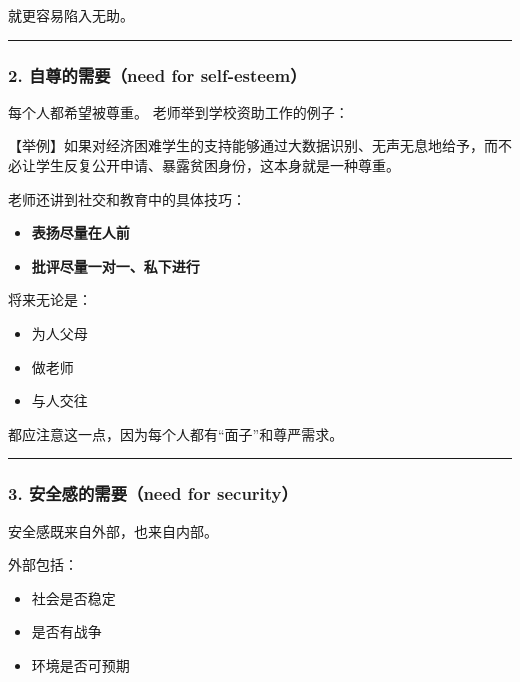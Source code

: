 \documentclass[
  chinese,
  9pt,
  a4paper,
]{ctexart}
\providecommand{\tightlist}{%
  \setlength{\itemsep}{0pt}\setlength{\parskip}{0pt}}
\begin{document}
就更容易陷入无助。

\begin{center}\rule{0.5\linewidth}{0.5pt}\end{center}

\subsubsection{2. 自尊的需要（need for
self-esteem）}\label{ux81eaux5c0aux7684ux9700ux8981need-for-self-esteem}

每个人都希望被尊重。 老师举到学校资助工作的例子：

【举例】如果对经济困难学生的支持能够通过大数据识别、无声无息地给予，而不必让学生反复公开申请、暴露贫困身份，这本身就是一种尊重。

老师还讲到社交和教育中的具体技巧：

\begin{itemize}
\tightlist
\item
  \textbf{表扬尽量在人前}
\item
  \textbf{批评尽量一对一、私下进行}
\end{itemize}

将来无论是：

\begin{itemize}
\tightlist
\item
  为人父母
\item
  做老师
\item
  与人交往
\end{itemize}

都应注意这一点，因为每个人都有``面子''和尊严需求。

\begin{center}\rule{0.5\linewidth}{0.5pt}\end{center}

\subsubsection{3. 安全感的需要（need for
security）}\label{ux5b89ux5168ux611fux7684ux9700ux8981need-for-security}

安全感既来自外部，也来自内部。

外部包括：

\begin{itemize}
\tightlist
\item
  社会是否稳定
\item
  是否有战争
\item
  环境是否可预期
\end{itemize}
\end{document}
